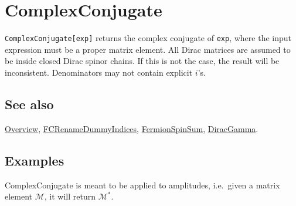 \documentclass[../FeynCalcManual.tex]{subfiles}
\begin{document}
\hypertarget{complexconjugate}{%
\section{ComplexConjugate}\label{complexconjugate}}

\texttt{ComplexConjugate[\allowbreak{}exp]} returns the complex
conjugate of \texttt{exp}, where the input expression must be a proper
matrix element. All Dirac matrices are assumed to be inside closed Dirac
spinor chains. If this is not the case, the result will be inconsistent.
Denominators may not contain explicit \(i\)'s.

\subsection{See also}

\hyperlink{toc}{Overview},
\hyperlink{fcrenamedummyindices}{FCRenameDummyIndices},
\hyperlink{fermionspinsum}{FermionSpinSum},
\hyperlink{diracgamma}{DiracGamma}.

\subsection{Examples}

ComplexConjugate is meant to be applied to amplitudes, i.e.~given a
matrix element \(\mathcal{M}\), it will return \(\mathcal{M}^\ast\).
\end{document}
